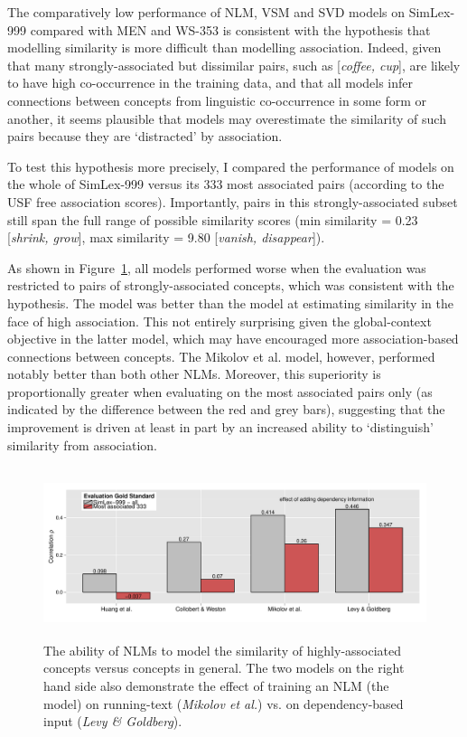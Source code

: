 The comparatively low performance of NLM, VSM and SVD models on SimLex-999 compared with MEN and WS-353 is consistent with the hypothesis that modelling similarity is more difficult than modelling association. Indeed, given that many strongly-associated but dissimilar pairs, such as [\emph{coffee, cup}], are likely to have high co-occurrence in the training data, and that all models infer connections between concepts from linguistic co-occurrence in some form or another, it seems plausible that models may overestimate the similarity of such pairs because they are `distracted' by association.

To test this hypothesis more precisely, I compared the performance of models on the whole of SimLex-999 versus its 333 most associated pairs (according to the USF free association scores). Importantly, pairs in this strongly-associated subset still span the full range of possible similarity scores (min similarity = 0.23 [\emph{shrink, grow}], max similarity = 9.80 [\emph{vanish, disappear}]).     

As shown in Figure~\ref{fig9}, all models performed worse when the evaluation was restricted to pairs of strongly-associated concepts, which was consistent with the hypothesis. The \cite{collobert2008unified} model was better than the \cite{huang2012improving} model at estimating similarity in the face of high association. This not entirely surprising given the global-context objective in the latter model, which may have encouraged more association-based connections between concepts. The Mikolov et al. model, however, performed notably better than both other NLMs. Moreover, this superiority is proportionally greater when evaluating on the most associated pairs only (as indicated by the difference between the red and grey bars), suggesting that the improvement is driven at least in part by an increased ability to `distinguish' similarity from association. 

\begin{figure}[]  \includegraphics[width = \textwidth,height=5cm]{Chapter_2/Figure_3A_CL}  \caption{\label{fig9} The ability of NLMs to model the similarity of highly-associated concepts versus concepts in general. The two models on the right hand side also demonstrate the effect of training an NLM (the \protect\cite{mikolov2013efficient} model) on running-text (\emph{Mikolov et al.}) vs. on dependency-based input (\emph{Levy \& Goldberg}).}\end{figure}

